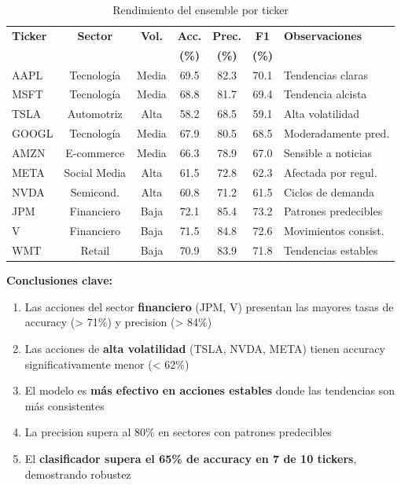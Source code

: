 \documentclass[12pt,a4paper]{report}
\begin{document}
\begin{table}[H]
\centering
\caption{Rendimiento del ensemble por ticker}
\label{tab:analisis-ticker}
\small
\begin{tabular}{lcccccl}
\toprule
\textbf{Ticker} & \textbf{Sector} & \textbf{Vol.} & \textbf{Acc.} & \textbf{Prec.} & \textbf{F1} & \textbf{Observaciones} \\
 & & & \textbf{(\%)} & \textbf{(\%)} & \textbf{(\%)} & \\
\midrule
AAPL & Tecnología & Media & 69.5 & 82.3 & 70.1 & Tendencias claras \\
MSFT & Tecnología & Media & 68.8 & 81.7 & 69.4 & Tendencia alcista \\
TSLA & Automotriz & Alta & 58.2 & 68.5 & 59.1 & Alta volatilidad \\
GOOGL & Tecnología & Media & 67.9 & 80.5 & 68.5 & Moderadamente pred. \\
AMZN & E-commerce & Media & 66.3 & 78.9 & 67.0 & Sensible a noticias \\
META & Social Media & Alta & 61.5 & 72.8 & 62.3 & Afectada por regul. \\
NVDA & Semicond. & Alta & 60.8 & 71.2 & 61.5 & Ciclos de demanda \\
JPM & Financiero & Baja & 72.1 & 85.4 & 73.2 & Patrones predecibles \\
V & Financiero & Baja & 71.5 & 84.8 & 72.6 & Movimientos consist. \\
WMT & Retail & Baja & 70.9 & 83.9 & 71.8 & Tendencias estables \\
\bottomrule
\end{tabular}
\end{table}

\textbf{Conclusiones clave:}

\begin{enumerate}
    \item Las acciones del sector \textbf{financiero} (JPM, V) presentan las mayores tasas de accuracy (> 71\%) y precision (> 84\%)
    \item Las acciones de \textbf{alta volatilidad} (TSLA, NVDA, META) tienen accuracy significativamente menor (< 62\%)
    \item El modelo es \textbf{más efectivo en acciones estables} donde las tendencias son más consistentes
    \item La precision supera al 80\% en sectores con patrones predecibles
    \item El \textbf{clasificador supera el 65\% de accuracy en 7 de 10 tickers}, demostrando robustez
\end{enumerate}
\end{document}
